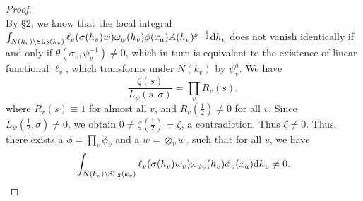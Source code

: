 \begin{proof}
\[\]
By \S 2, we know that the local integral $\int_{N(k_v) \backslash \mathrm{SL}_2(k_v)} \ell_v(\sigma(h_v)w) \omega_\psi(h_v)\phi(x_a) A(h_v)^{s -\frac{1}{2}} \mathrm{d} h_v$ does not vanish identically if and only if $\theta(\sigma_v, \psi_v^{-1}) \neq 0$, which in turn is equivalent to the existence of linear functional $\ell_v$, which transforms under $N(k_v)$ by $\psi_v^a$.
We have
\[
\frac{\zeta(s)}{L_\psi(s, \sigma)} = \prod_v R_v(s),
\]
where $R_v(s) \equiv 1$ for almost all $v$, and $R_v(\frac{1}{2}) \neq 0$ for all $v$.
Since $L_\psi(\frac{1}{2}, \sigma) \neq 0$, we obtain $0 \neq \zeta(\frac{1}{2}) = \zeta$, a contradiction.
Thus $\zeta \neq 0$.
Thus, there exists a $\phi = \prod_v \phi_v$ and a $w = \otimes_v w_v$ such that for all $v$, we have
\[
\int_{N(k_v) \backslash \mathrm{SL}_2(k_v)}  \ell_v(\sigma(h_v) w_v) \omega_{\psi_v}(h_v) \phi_v(x_a) \mathrm{d} h_v \neq 0.
\]
\end{proof}

